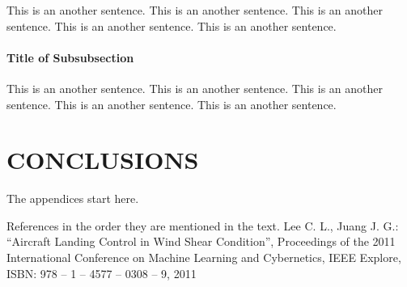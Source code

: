 \documentclass[12pt]{report}
\begin{document}
This is an another sentence. This is an another sentence. This is an another sentence. This is an another sentence. 
This is an another sentence.

\subsubsection{Title of Subsubsection}

This is an another sentence. This is an another sentence. This is an another sentence. This is an another sentence. 
This is an another sentence.

\chapter{CONCLUSIONS}



The appendices start here.

\begin{thebibliography}{9}
 References in the order they are mentioned in the text.
 Lee C. L., Juang J. G.: “Aircraft Landing Control in Wind Shear Condition”,
Proceedings of the 2011 International Conference on Machine Learning and
Cybernetics, IEEE Explore, ISBN: 978 – 1 – 4577 – 0308 – 9, 2011

\end{thebibliography}
\end{document}
